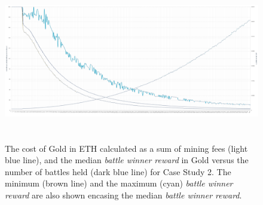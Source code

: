 \documentclass[12pt]{article}
\begin{document}
{%




\begin{figure}[H]
	\begin{Center}
		\includegraphics[width=6.27in,height=2.76in]{./media/CS2image2.png}
		\caption{The cost of Gold in ETH calculated as a sum of mining fees (light blue line), and the median {\it battle winner reward} in Gold versus the number of battles held (dark blue line) for Case Study 2. The minimum (brown line) and the maximum (cyan) {\it battle winner reward} are also shown encasing the median {\it battle winner reward}.}
		\label{The cost of Gold in dollars calculated as a mining fee (light blue line), and the median battle reward in Gold versus the number of battles held (dark blue line).}
	\end{Center}
\end{figure}




}
\end{document}
